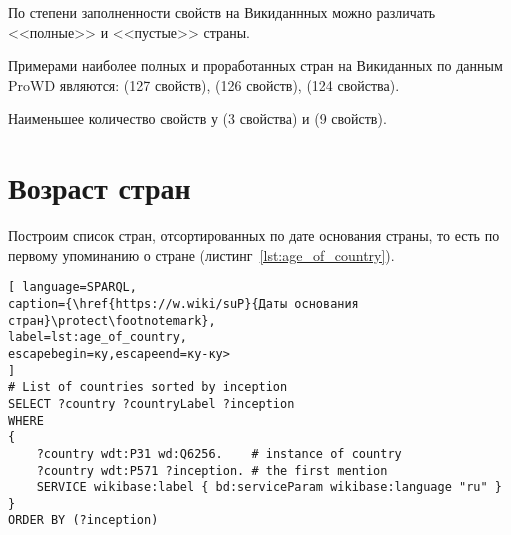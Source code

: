 По степени заполненности свойств на Викиданнных можно различать <<полные>> и  <<пустые>> страны. 

Примерами наиболее полных и проработанных стран на Викиданных по данным ProWD\cite{prowd_balakireva} являются:  (127 свойств),  (126 свойств),  (124 свойства).

Наименьшее количество свойств у  (3 свойства) и  (9 свойств).

\section{Возраст стран}


Построим список стран, отсортированных по дате основания страны, то есть по первому упоминанию о стране (листинг~\ref{lst:age_of_country}).

\begin{lstlisting}[ language=SPARQL, 
caption={\href{https://w.wiki/suP}{Даты основания стран}\protect\footnotemark},
label=lst:age_of_country, 
escapebegin=ку,escapeend=ку-ку>
]
# List of countries sorted by inception 
SELECT ?country ?countryLabel ?inception
WHERE
{
	?country wdt:P31 wd:Q6256.    # instance of country
	?country wdt:P571 ?inception. # the first mention
	SERVICE wikibase:label { bd:serviceParam wikibase:language "ru" }
}
ORDER BY (?inception)
\end{lstlisting}

